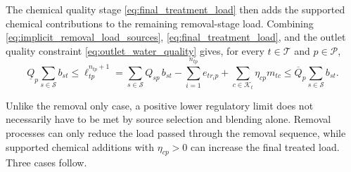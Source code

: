 \documentclass[10pt]{article}
\begin{document}
The chemical quality stage \eqref{eq:final_treatment_load} then adds the supported chemical contributions to the remaining removal-stage load.
Combining \eqref{eq:implicit_removal_load_sources}, \eqref{eq:final_treatment_load}, and the outlet quality constraint
\eqref{eq:outlet_water_quality} gives, for every $t \in \mathcal{T}$ and $p \in \mathcal{P}$,
\begin{equation}\label{eq:implicit_final_quality_bounds}
    \underline{Q}_p \sum_{s \in \mathcal{S}} b_{st}
    \le
    \ell^{n_{tp}+1}_{tp}
    =
    \sum_{s \in \mathcal{S}} Q_{sp}\,b_{st}
    -
    \sum_{i=1}^{n_{tp}} e_{t r_i p}
    +
    \sum_{c \in \mathcal{K}_t} \eta_{cp}m_{tc}
    \le
    \overline{Q}_p \sum_{s \in \mathcal{S}} b_{st}.
\end{equation}

Unlike the removal only case, a positive lower regulatory limit does not necessarily have to be met by source selection and blending alone.
Removal processes can only reduce the load passed through the removal sequence, while supported chemical additions with $\eta_{cp}>0$ can increase the final treated load.
Three cases follow.
\end{document}
